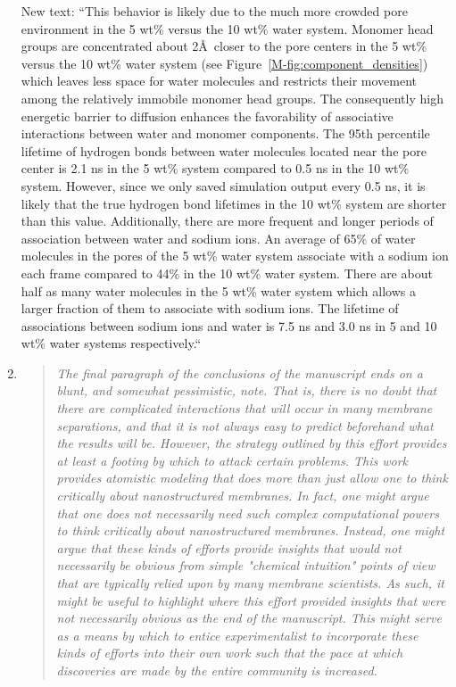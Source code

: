 \documentclass{article}
\begin{document}
\begin{enumerate}
    New text: ``This behavior is likely due to the much more crowded pore environment
    in the 5 wt\% versus the 10 wt\% water system. Monomer head groups are
    concentrated about 2\AA~closer to the pore centers in the 5 wt\% versus the 10 
    wt\% water system (see Figure~\ref{M-fig:component_densities})  %
    which leaves less space for water molecules and restricts their movement among the 
    relatively immobile monomer head groups. The consequently high energetic barrier 
    to diffusion enhances the favorability of associative interactions between water
    and monomer components. The 95th percentile lifetime of hydrogen bonds between 
    water molecules located near the pore center is 2.1 ns in the 5 wt\% system compared
    to 0.5 ns in the 10 wt\% system. However, since we only saved simulation output 
    every 0.5 ns, it is likely that the true hydrogen bond lifetimes in the 10 wt\% 
    system are shorter than this value. Additionally, there are more frequent and longer
    periods of association between water and sodium ions. An average of 65\% of water 
    molecules in the pores of the 5 wt\% water system associate with a sodium ion each
    frame compared to 44\% in the 10 wt\% water system.
	There are about half as many water molecules in the 5 wt\% water system which allows a 
	larger fraction of them to associate with sodium ions. The lifetime of associations
	between sodium ions and water is 7.5 ns and 3.0 ns in 5 and 10 wt\% water systems respectively.``
	
    \item \begin{quote}
    \textit{The final paragraph of the conclusions of the manuscript ends on a blunt, and 
    somewhat pessimistic, note. That is, there is no doubt that there are complicated 
    interactions that will occur in many membrane separations, and that it is not always 
    easy to predict beforehand what the results will be. However, the strategy outlined 
    by this effort provides at least a footing by which to attack certain problems. This
    work provides atomistic modeling that does more than just allow one to think critically
    about nanostructured membranes. In fact, one might argue that one does not necessarily
    need such complex computational powers to think critically about nanostructured 
    membranes. Instead, one might argue that these kinds of efforts provide insights that
    would not necessarily be obvious from simple "chemical intuition" points of view that 
    are typically relied upon by many membrane scientists. As such, it might be useful to
    highlight where this effort provided insights that were not necessarily obvious as the
    end of the manuscript. This might serve as a means by which to entice experimentalist
    to incorporate these kinds of efforts into their own work such that the pace at which
    discoveries are made by the entire community is increased.}
    \end{quote}
	

\end{enumerate}
\end{document}
